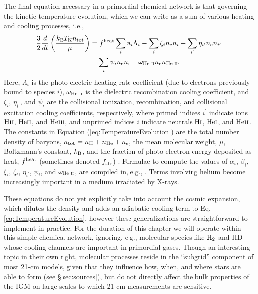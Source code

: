 The final equation necessary in a primordial chemical network is that governing the kinetic temperature evolution, which we can write as a sum of various heating and cooling processes, i.e.,
\begin{align}
    \frac{3}{2}\frac{d}{dt}\left(\frac{k_{\text{B}} T_{\text{K}} n_{\text{tot}}}{\mu}\right) & = f^{\text{heat}}  \sum_i n_i \Lambda_i - \sum_i \zeta_i n_{\text{e}} n_i - \sum_{i^{\prime}} \eta_{i^{\prime}} n_{\text{e}} n_{i^{\prime}} \nonumber \\ & - \sum_i \psi_i n_{\text{e}} n_i - \omega_{\text{He } \textsc{ii}} n_{\text{e}} n_{\text{He } \textsc{ii}} \label{eq:TemperatureEvolution} .
\end{align}
Here, $\Lambda_i$ is the photo-electric heating rate coefficient (due to
electrons previously bound to species $i$), $\omega_{\text{He } \textsc{ii}}$ is the dielectric
recombination cooling coefficient, and $\zeta_i$, $\eta_{i^{\prime}}$, and
$\psi_i$ are the collisional ionization, recombination, and collisional
excitation cooling coefficients, respectively, where primed indices
$i^{\prime}$ indicate ions $\text{H} {\textsc{ii}}$, $\text{He} {\textsc{ii}}$, and $\text{He} {\textsc{iii}}$, and unprimed
indices $i$ indicate neutrals $\text{H} {\textsc{i}}$, $\text{He} {\textsc{i}}$, and $\text{He} {\textsc{ii}}$. The constants in
Equation (\ref{eq:TemperatureEvolution}) are the total number density of
baryons, $n_{\text{tot}} = n_\mathrm{H} + n_{\mathrm{He}} + n_{\text{e}}$, the mean molecular
weight, $\mu$, Boltzmann's constant, $k_{\text{B}}$, and the fraction of photo-electron energy deposited as heat, $f^{\text{heat}}$ (sometimes denoted $f_{\mathrm{abs}}$) \cite{Shull1985,Furlanetto2010}. Formulae to compute the values of
$\alpha_i$, $\beta_i$, $\xi_i$, $\zeta_i$, $\eta_{i^{\prime}}$, $\psi_i$, and
$\omega_{\text{He } \textsc{ii}}$, are compiled in, e.g., \cite{Fukugita1994,Hui1997}. Terms involving helium become increasingly important in a medium irradiated by X-rays.

These equations do not yet explicitly take into account the cosmic expansion, which dilutes the density and adds an adiabatic cooling term to Eq. \ref{eq:TemperatureEvolution}, however these generalizations are straightforward to implement in practice. For the duration of this chapter we will operate within this simple chemical network, ignoring, e.g., molecular species like $\text{H}_2$ and $\mathrm{HD}$ whose cooling channels are important in primordial gases. Though an interesting topic in their own right, molecular processes reside in the ``subgrid'' component of most 21-cm models, given that they influence how, when, and where stars are able to form (see \S\ref{sec:sources}), but do not directly affect the bulk properties of the IGM on large scales to which 21-cm measurements are sensitive. 

